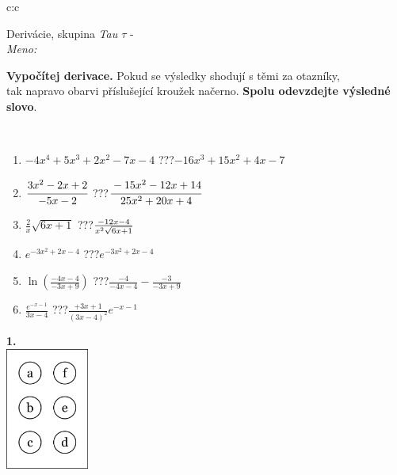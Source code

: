 \documentclass[10pt]{report}
\begin{document}
\begin{tabular}{c:c}
\begin{minipage}[c][104.5mm][t]{0.5\linewidth}
\begin{center}
\vspace{7mm}
{\huge Derivácie, skupina \textit{Tau $\tau$} -}\\[5mm]
\textit{Meno:}\phantom{xxxxxxxxxxxxxxxxxxxxxxxxxxxxxxxxxxxxxxxxxxxxxxxxxxxxxxxxxxxxxxxxx}\\[5mm]
\begin{minipage}{0.95\linewidth}
\begin{center}
\textbf{Vypočítej derivace.} Pokud se výsledky shodují s těmi za otazníky,\\tak napravo obarvi příslušející kroužek načerno. \textbf{Spolu odevzdejte výsledné slovo}.
\end{center}
\end{minipage}
\\[1mm]
\begin{minipage}{0.79\linewidth}
\begin{center}
\begin{varwidth}{\linewidth}
\begin{enumerate}
\normalsize
\item $-4x^4+5x^3+2x^2-7x-4$\quad \dotfill\; ???\;\dotfill \quad $-16x^3+15x^2+4x-7$
\item $\cfrac{3x^2-2x+2}{-5x-2}$\quad \dotfill\; ???\;\dotfill \quad $\cfrac{-15x^2-12x+14}{25x^2+20x+4}$
\item $\frac{2}{x}\sqrt{6x+1}$\quad \dotfill\; ???\;\dotfill \quad $\frac{-12x-4}{x^2 \sqrt{\smash[b]{6x+1}}}$
\item $e^{-3x^2+2x-4}$\quad \dotfill\; ???\;\dotfill \quad $e^{-3x^2+2x-4}$
\item $\ln{\left(\frac{-4x-4}{-3x+9}\right)}$\quad \dotfill\; ???\;\dotfill \quad $\frac{-4}{-4x-4}-\frac{-3}{-3x+9}$
\item $\frac{e^{-x-1}}{3x-4}$\quad \dotfill\; ???\;\dotfill \quad $\frac{+3x+1}{(3x-4)^2}e^{-x-1}$
\end{enumerate}
\end{varwidth}
\end{center}
\end{minipage}
\begin{minipage}{0.20\linewidth}
\begin{center}
{\Huge\bfseries 1.} \\[2mm]
\includegraphics[height=40mm]{../images/braille.png}

\end{center}
\end{minipage}
\end{center}
\end{minipage}
\end{tabular}
\end{document}
